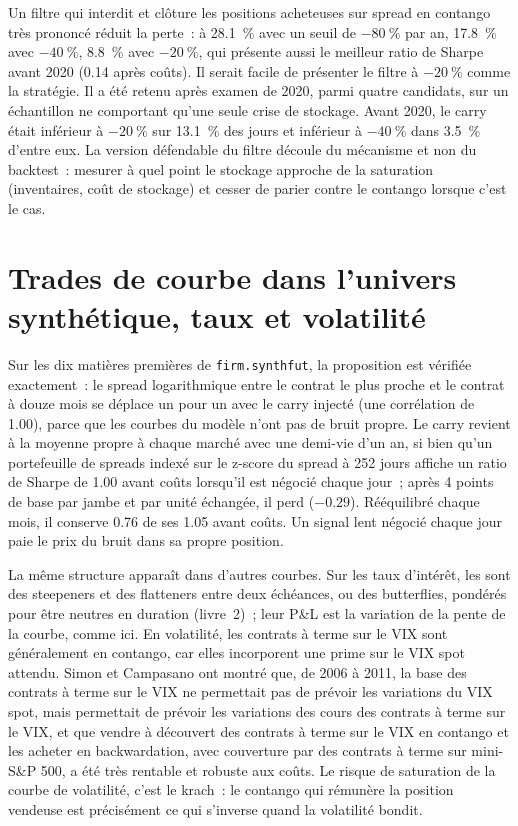 Un filtre qui interdit et clôture les positions acheteuses sur spread en contango très prononcé réduit la perte~: à 28.1~\% avec un seuil de $-80~\%$ par an, 17.8~\% avec $-40~\%$,
8.8~\% avec $-20~\%$, qui présente aussi le meilleur ratio de Sharpe avant 2020 (0.14 après coûts). Il serait facile de présenter le filtre à $-20~\%$ comme la
stratégie. Il a été retenu après examen de 2020, parmi quatre candidats, sur un échantillon ne comportant qu'une seule crise de stockage. Avant 2020, le carry était inférieur à $-20~\%$ sur
13.1~\% des jours et inférieur à $-40~\%$ dans 3.5~\% d'entre eux. La version défendable du filtre découle du mécanisme et non du backtest~: mesurer à quel point
le stockage approche de la saturation (inventaires, coût de stockage) et cesser de parier contre le contango lorsque c'est le cas.

\section{Trades de courbe dans l'univers synthétique, taux et volatilité}

Sur les dix matières premières de \texttt{firm.synthfut}, la proposition est vérifiée exactement~: le spread logarithmique entre le contrat le plus proche et le contrat à douze mois se déplace
un pour un avec le carry injecté (une corrélation de 1.00), parce que les courbes du modèle n'ont pas de bruit propre. Le carry revient à la moyenne propre à chaque marché
avec une demi-vie d'un an, si bien qu'un portefeuille de spreads indexé sur le z-score du spread à 252 jours affiche un ratio de Sharpe de 1.00 avant coûts lorsqu'il est négocié chaque jour~; après 4
points de base par jambe et par unité échangée, il perd ($-0.29$). Rééquilibré chaque mois, il conserve 0.76 de ses 1.05 avant coûts. Un signal lent négocié chaque jour paie le
prix du bruit dans sa propre position.

La même structure apparaît dans d'autres courbes. Sur les taux d'intérêt, les  sont des steepeners et des flatteners entre deux échéances, ou des butterflies,
pondérés pour être neutres en duration (livre~2)~; leur P\&L est la variation de la pente de la courbe, comme ici. En volatilité, les contrats à terme sur le VIX sont généralement en contango,
car elles incorporent une prime sur le VIX spot attendu. Simon et Campasano ont montré que, de 2006 à 2011, la base des contrats à terme sur le VIX ne permettait pas de prévoir
les variations du VIX spot, mais permettait de prévoir les variations des cours des contrats à terme sur le VIX, et que vendre à découvert des contrats à terme sur le VIX en contango et les acheter en backwardation, avec couverture
par des contrats à terme sur mini-S\&P 500, a été très rentable et robuste aux coûts. Le risque de saturation de la courbe de volatilité, c'est le krach~: le contango qui rémunère la position vendeuse
est précisément ce qui s'inverse quand la volatilité bondit.

